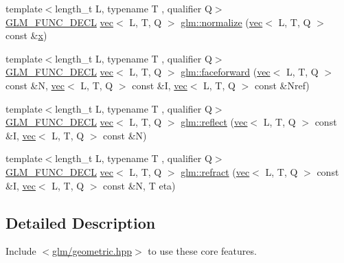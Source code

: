 \begin{DoxyCompactItemize}
\item 
{\footnotesize template$<$length\+\_\+t L, typename T , qualifier Q$>$ }\\\hyperlink{setup_8hpp_ab2d052de21a70539923e9bcbf6e83a51}{G\+L\+M\+\_\+\+F\+U\+N\+C\+\_\+\+D\+E\+CL} \hyperlink{structglm_1_1vec}{vec}$<$ L, T, Q $>$ \hyperlink{group__core__func__geometric_ga3b8d3dcae77870781392ed2902cce597}{glm\+::normalize} (\hyperlink{structglm_1_1vec}{vec}$<$ L, T, Q $>$ const \&\hyperlink{_s_d_l__opengl_8h_ad0e63d0edcdbd3d79554076bf309fd47}{x})
\item 
{\footnotesize template$<$length\+\_\+t L, typename T , qualifier Q$>$ }\\\hyperlink{setup_8hpp_ab2d052de21a70539923e9bcbf6e83a51}{G\+L\+M\+\_\+\+F\+U\+N\+C\+\_\+\+D\+E\+CL} \hyperlink{structglm_1_1vec}{vec}$<$ L, T, Q $>$ \hyperlink{group__core__func__geometric_ga7aed0a36c738169402404a3a5d54e43b}{glm\+::faceforward} (\hyperlink{structglm_1_1vec}{vec}$<$ L, T, Q $>$ const \&N, \hyperlink{structglm_1_1vec}{vec}$<$ L, T, Q $>$ const \&I, \hyperlink{structglm_1_1vec}{vec}$<$ L, T, Q $>$ const \&Nref)
\item 
{\footnotesize template$<$length\+\_\+t L, typename T , qualifier Q$>$ }\\\hyperlink{setup_8hpp_ab2d052de21a70539923e9bcbf6e83a51}{G\+L\+M\+\_\+\+F\+U\+N\+C\+\_\+\+D\+E\+CL} \hyperlink{structglm_1_1vec}{vec}$<$ L, T, Q $>$ \hyperlink{group__core__func__geometric_ga5631dd1d5618de5450b1ea3cf3e94905}{glm\+::reflect} (\hyperlink{structglm_1_1vec}{vec}$<$ L, T, Q $>$ const \&I, \hyperlink{structglm_1_1vec}{vec}$<$ L, T, Q $>$ const \&N)
\item 
{\footnotesize template$<$length\+\_\+t L, typename T , qualifier Q$>$ }\\\hyperlink{setup_8hpp_ab2d052de21a70539923e9bcbf6e83a51}{G\+L\+M\+\_\+\+F\+U\+N\+C\+\_\+\+D\+E\+CL} \hyperlink{structglm_1_1vec}{vec}$<$ L, T, Q $>$ \hyperlink{group__core__func__geometric_ga01da3dff9e2ef6b9d4915c3047e22b74}{glm\+::refract} (\hyperlink{structglm_1_1vec}{vec}$<$ L, T, Q $>$ const \&I, \hyperlink{structglm_1_1vec}{vec}$<$ L, T, Q $>$ const \&N, T eta)
\end{DoxyCompactItemize}


\subsection{Detailed Description}
Include $<$\hyperlink{geometric_8hpp}{glm/geometric.\+hpp}$>$ to use these core features.


